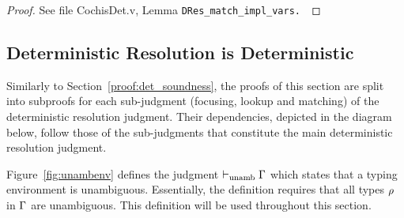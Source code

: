 \begin{proof}
See file CochisDet.v, Lemma \tt{DRes\_match\_impl\_vars}.
\end{proof}

\subsection{Deterministic Resolution is Deterministic}\label{proof:determinism}

Similarly to Section~\ref{proof:det_soundness}, the proofs of this section are split into subproofs for each sub-judgment (focusing, lookup and
matching) of the deterministic resolution judgment. Their dependencies, depicted in the diagram below, follow those of the sub-judgments that constitute the main deterministic resolution
judgment.
\begin{center}
\end{center}\vspace{0.3cm}

Figure~\ref{fig:unambenv} defines the judgment ${{ \vdash_{\mathrm{unamb}} \Gamma}}$ which states that a typing environment is unambiguous.
Essentially, the definition requires that all types $\rho$ in $\Gamma$ are unambiguous.
This definition will be used throughout this section.

\figtwocol{fig:unambenv}{Unambiguous Type Environment}{
\begin{center}
\framebox{%
\begin{minipage}{0.969\textwidth}
\bda{c} 
\multicolumn{1}{c}{\myruleform{\unambenv{\tenv}}} \\ \\
\myrule{UE-Empty}
  { }
  { \unambenv{\epsilon} } \quad\quad\quad
  
\myrule{UE-Var}
  {\unambenv{\tenv}} %
  {\unambenv{\tenv, \relation{x}{\rulet}}}\\ \\

\myrule{UE-TVar}
  { \unambenv{\tenv} }
  { \unambenv{\tenv,\alpha} } \quad\quad\quad

\myrule{UE-Impl}
  { \unambenv{\tenv} \quad\quad \unambig{}{\rulet} }
  { \unambenv{\tenv, \envi{\rulet}{x}} }
\eda
\end{minipage}
}
\end{center}
}

